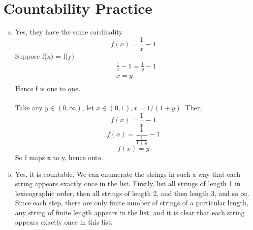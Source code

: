\documentclass{article}
\begin{document}
\part*{Countability Practice}
    \begin{enumerate}[(a).]
        \item Yes, they have the same cardinality.
        \[f(x) = \frac{1}{x} - 1\]
        Suppose f(x) = f(y)\\
        \begin{align*}
            &\frac{1}{x} - 1 = \frac{1}{y} - 1\\
            &x = y\\
        \end{align*}
        Hence f is one to one.\\
        \\
        Take any $y \in (0, \infty)$, let $x \in (0, 1), x = 1/(1+y)$. Then,
        \[f(x) = \frac{1}{x} - 1 \]
        \[f(x) = \frac{1}{\frac{1}{1+y}} - 1\]
        \[f(x) =  y\]
        So f maps x to y, hence onto.

        \item Yes, it is countable. We can enumerate the strings in 
        such a way that each string appears exactly once in the list. 
        Firstly, list all strings of length 1 in lexicographic order, then 
        all strings of length 2, and then length 3, and so on. Since each step, 
        there are only finite number of strings of a particular length, any string 
        of finite length appears in the list, and it is clear that each string 
        appears exactly once in this list.

        
        


    \end{enumerate}    
\end{document}
